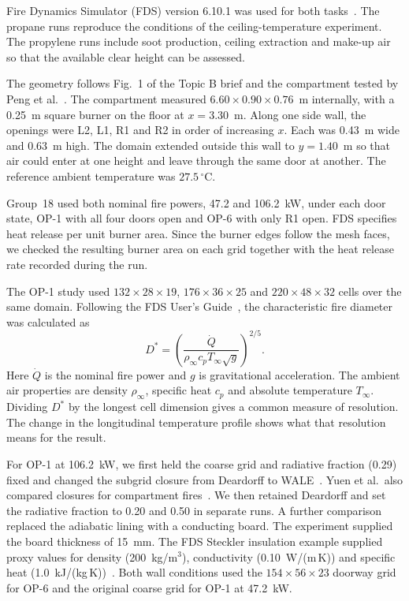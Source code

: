 Fire Dynamics Simulator (FDS) version 6.10.1 was used for both tasks~\cite{fdsuser}. The propane runs reproduce the conditions of the ceiling-temperature experiment. The propylene runs include soot production, ceiling extraction and make-up air so that the available clear height can be assessed.



The geometry follows Fig.~1 of the Topic B brief and the compartment tested by Peng et al.~\cite{peng}. The compartment measured $6.60 \times 0.90 \times 0.76$~m internally, with a 0.25~m square burner on the floor at $x=3.30$~m. Along one side wall, the openings were L2, L1, R1 and R2 in order of increasing $x$. Each was 0.43~m wide and 0.63~m high. The domain extended outside this wall to $y=1.40$~m so that air could enter at one height and leave through the same door at another. The reference ambient temperature was $27.5\,^{\circ}$C.

Group~18 used both nominal fire powers, 47.2 and 106.2~kW, under each door state, OP-1 with all four doors open and OP-6 with only R1 open. FDS specifies heat release per unit burner area. Since the burner edges follow the mesh faces, we checked the resulting burner area on each grid together with the heat release rate recorded during the run.

\clearpage
{}
The OP-1 study used $132\times28\times19$, $176\times36\times25$ and $220\times48\times32$ cells over the same domain. Following the FDS User’s Guide~\cite{fdsuser}, the characteristic fire diameter was calculated as
\[
 D^*=\left(\frac{\dot Q}{\rho_\infty c_p T_\infty\sqrt{g}}\right)^{2/5}.
\]
Here $\dot Q$ is the nominal fire power and $g$ is gravitational acceleration. The ambient air properties are density $\rho_\infty$, specific heat $c_p$ and absolute temperature $T_\infty$. Dividing $D^*$ by the longest cell dimension gives a common measure of resolution. The change in the longitudinal temperature profile shows what that resolution means for the result.

For OP-1 at 106.2~kW, we first held the coarse grid and radiative fraction (0.29) fixed and changed the subgrid closure from Deardorff to WALE~\cite{fdstech}. Yuen et al.\ also compared closures for compartment fires~\cite{yuen}. We then retained Deardorff and set the radiative fraction to 0.20 and 0.50 in separate runs. A further comparison replaced the adiabatic lining with a conducting board. The experiment supplied the board thickness of 15~mm. The FDS Steckler insulation example supplied proxy values for density (200~kg/m$^3$), conductivity (0.10~W/(m\,K)) and specific heat (1.0~kJ/(kg\,K))~\cite{steckler}. Both wall conditions used the $154\times56\times23$ doorway grid for OP-6 and the original coarse grid for OP-1 at 47.2~kW.

